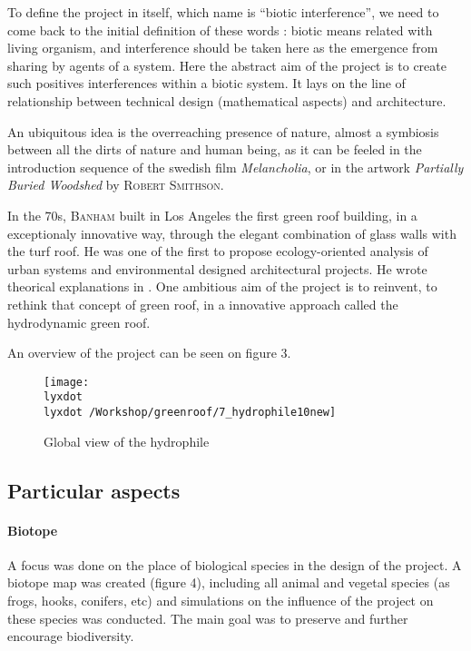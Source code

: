 \documentclass[english]{article}
\newcommand{\noun}[1]{\textsc{#1}}
\newcommand{\lyxdot}{.}
\begin{document}
To define the project in itself, which name is ``biotic interference'',
we need to come back to the initial definition of these words : biotic
means related with living organism, and interference should be taken
here as the emergence from sharing by agents of a system. Here the
abstract aim of the project is to create such positives interferences
within a biotic system. It lays on the line of relationship between
technical design (mathematical aspects) and architecture.

\bigskip{}


An ubiquitous idea is the overreaching presence of nature, almost
a symbiosis between all the dirts of nature and human being, as it
can be feeled in the introduction sequence of the swedish film \textit{Melancholia},
or in the artwork \textit{Partially Buried Woodshed} by \noun{Robert
Smithson}.

\bigskip{}


In the 70s, \noun{Banham} built in Los Angeles the first green roof
building, in a exceptionaly innovative way, through the elegant combination
of glass walls with the turf roof. He was one of the first to propose
ecology-oriented analysis of urban systems and environmental designed
architectural projects. He wrote theorical explanations in \cite{banham1984architecture}.
One ambitious aim of the project is to reinvent, to rethink that concept
of green roof, in a innovative approach called the hydrodynamic green
roof.

\bigskip{}


An overview of the project can be seen on figure 3.

\begin{figure}[h]
\texttt{[image: \\lyxdot \\lyxdot /Workshop/greenroof/7\_hydrophile10new]}\caption{Global view of the hydrophile}
\end{figure}



\subsection*{Particular aspects}


\paragraph{Biotope}

A focus was done on the place of biological species in the design
of the project. A biotope map was created (figure 4), including all
animal and vegetal species (as frogs, hooks, conifers, etc) and simulations
on the influence of the project on these species was conducted. The
main goal was to preserve and further encourage biodiversity.
\end{document}
